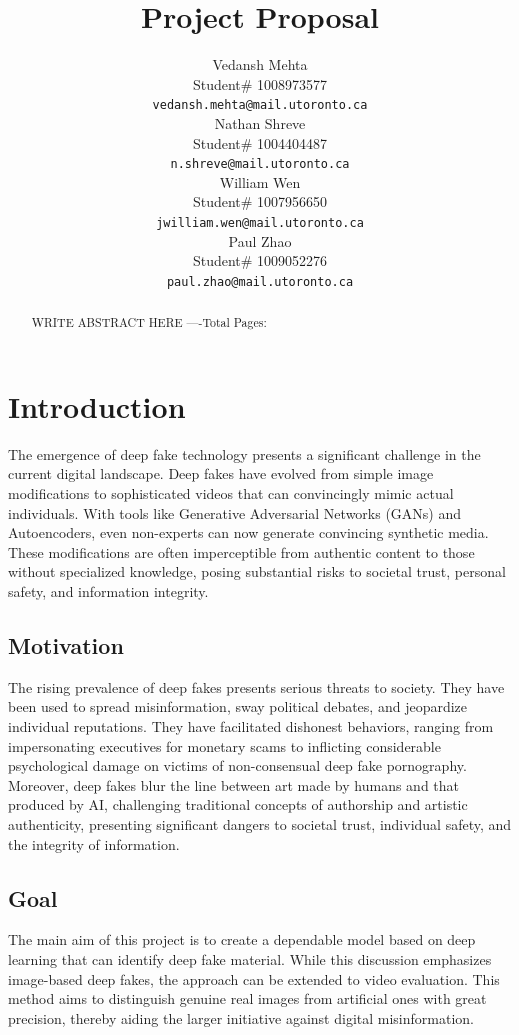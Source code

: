 \documentclass{article} %
\title{Project Proposal}
\author{Vedansh Mehta  \\
Student\# 1008973577 \\
\texttt{vedansh.mehta@mail.utoronto.ca} \\
\And
Nathan Shreve  \\
Student\# 1004404487 \\
\texttt{n.shreve@mail.utoronto.ca} \\
\AND
William Wen  \\
Student\# 1007956650 \\
\texttt{jwilliam.wen@mail.utoronto.ca} \\
\And
Paul Zhao \\
Student\# 1009052276 \\
\texttt{paul.zhao@mail.utoronto.ca} \\
\AND
}
\begin{document}
\maketitle

\begin{abstract}
WRITE ABSTRACT HERE
----Total Pages: \pageref{last_page}
\end{abstract}



\section{Introduction}
\label{intro}
The emergence of deep fake technology presents a significant challenge in the current digital landscape. Deep fakes have evolved from simple image modifications to sophisticated videos that can convincingly mimic actual individuals. With tools like Generative Adversarial Networks (GANs) and Autoencoders, even non-experts can now generate convincing synthetic media. These modifications are often imperceptible from authentic content to those without specialized knowledge, posing substantial risks to societal trust, personal safety, and information integrity.

\subsection{Motivation}
The rising prevalence of deep fakes presents serious threats to society. They have been used to spread misinformation, sway political debates, and jeopardize individual reputations. They have facilitated dishonest behaviors, ranging from impersonating executives for monetary scams to inflicting considerable psychological damage on victims of non-consensual deep fake pornography. Moreover, deep fakes blur the line between art made by humans and that produced by AI, challenging traditional concepts of authorship and artistic authenticity, presenting significant dangers to societal trust, individual safety, and the integrity of information.

\subsection{Goal}
The main aim of this project is to create a dependable model based on deep learning that can identify deep fake material. While this discussion emphasizes image-based deep fakes, the approach can be extended to video evaluation. 
This method aims to distinguish genuine real images from artificial ones with great precision, thereby aiding the larger initiative against digital misinformation. 
\end{document}
